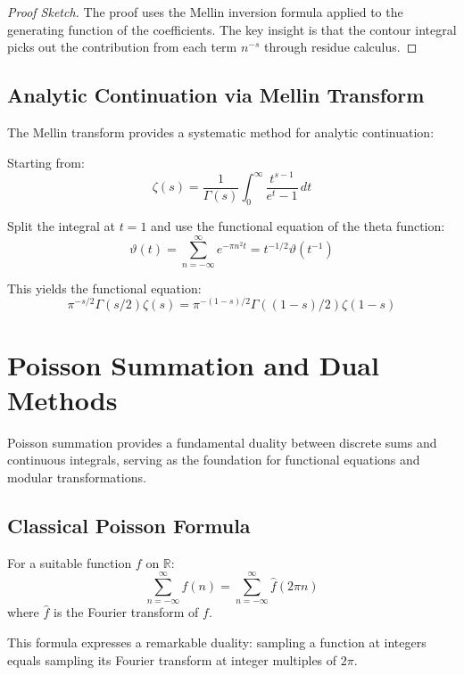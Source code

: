 \begin{proof}[Proof Sketch]
The proof uses the Mellin inversion formula applied to the generating function of the coefficients. The key insight is that the contour integral picks out the contribution from each term $n^{-s}$ through residue calculus.
\end{proof}

\subsection{Analytic Continuation via Mellin Transform}

The Mellin transform provides a systematic method for analytic continuation:

\begin{example}
Starting from:
$$\zeta(s) = \frac{1}{\Gamma(s)} \int_0^{\infty} \frac{t^{s-1}}{e^t - 1} \, dt$$

Split the integral at $t = 1$ and use the functional equation of the theta function:
$$\vartheta(t) = \sum_{n=-\infty}^{\infty} e^{-\pi n^2 t} = t^{-1/2} \vartheta(t^{-1})$$

This yields the functional equation:
$$\pi^{-s/2} \Gamma(s/2) \zeta(s) = \pi^{-(1-s)/2} \Gamma((1-s)/2) \zeta(1-s)$$
\end{example}

\section{Poisson Summation and Dual Methods}
\label{sec:poisson-summation}

Poisson summation provides a fundamental duality between discrete sums and continuous integrals, serving as the foundation for functional equations and modular transformations.

\subsection{Classical Poisson Formula}

\begin{theorem}
For a suitable function $f$ on $\mathbb{R}$:
$$\sum_{n=-\infty}^{\infty} f(n) = \sum_{n=-\infty}^{\infty} \hat{f}(2\pi n)$$
where $\hat{f}$ is the Fourier transform of $f$.
\end{theorem}

This formula expresses a remarkable duality: sampling a function at integers equals sampling its Fourier transform at integer multiples of $2\pi$.

